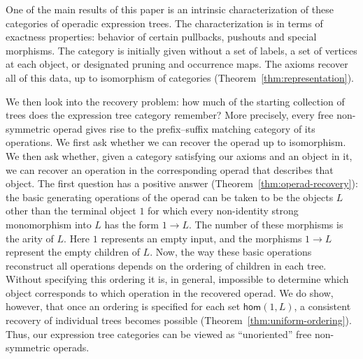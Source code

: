 \documentclass[11pt,a4paper]{article}
\theoremstyle{plain}
\theoremstyle{definition}
\theoremstyle{remark}
\begin{document}
One of the main results of this paper is an intrinsic characterization of these categories of operadic expression trees. The characterization is in terms of exactness properties: behavior of certain pullbacks, pushouts and special morphisms. The category is initially given without a set of labels,
a set of vertices at each object, or designated pruning and
occurrence maps. The axioms recover all of this data, up to isomorphism of categories (Theorem~\ref{thm:representation}).

We then look into the recovery problem: how much of the starting collection of trees does the expression tree category remember? More precisely, every free non-symmetric operad gives rise to the prefix--suffix matching category of its operations. We first ask whether we can recover the operad up to isomorphism. We then ask whether, given a category satisfying our axioms and an object in it, we can recover an operation in the corresponding operad that describes that object. The first question has a positive answer (Theorem~\ref{thm:operad-recovery}): the basic generating operations of the operad can be taken to be the objects $L$ other than the terminal object $1$ for which every non-identity strong monomorphism into $L$ has the form $1\to L$. The number of these morphisms is the arity of $L$. Here $1$ represents an empty input, and the morphisms $1\to L$ represent the empty children of $L$. Now, the way these basic operations reconstruct all operations depends on the ordering of children in each tree. Without specifying this ordering it is, in general, impossible to determine which object corresponds to which operation in the recovered operad. We do show, however, that once an ordering is specified for each set $\mathsf{hom}(1,L)$, a consistent recovery of individual trees becomes possible (Theorem~\ref{thm:uniform-ordering}). Thus, our expression tree categories can be viewed as ``unoriented'' free non-symmetric operads.
\end{document}
